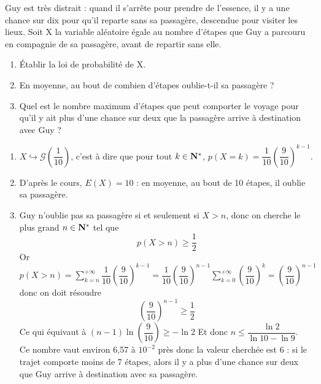 \documentclass[a4paper, 12pt]{colle}
\begin{document}
\exo
Guy est très distrait : quand il s'arrête pour prendre de l'essence, il y a une chance sur dix pour qu'il reparte sans sa passagère, descendue pour visiter les lieux.
Soit X la variable aléatoire égale au nombre d'étapes que Guy a parcouru en compagnie de sa passagère, avant de repartir sans elle.
\begin{enumerate}[\bfseries 1.]
	\item Établir la loi de probabilité de X.
	\item En moyenne, au bout de combien d'étapes oublie-t-il sa passagère ?
	\item Quel est le nombre maximum d'étapes que peut comporter le voyage pour qu'il y ait plus d'une chance sur deux que la passagère arrive à destination avec Guy ?
\end{enumerate}
\corr
\begin{enumerate}[\bfseries 1.]
	\item $X\hookrightarrow\mathcal{G}\left(\dfrac{1}{10}\right)$,
	      c'est à dire que pour tout $k\in\mathbf{N}^*$, $p(X=k)=\dfrac{1}{10}\left(\dfrac{9}{10}\right)^{k-1}$.
	\item D'après le cours, $E(X)=10$ : en moyenne, au bout de 10 étapes, il oublie sa passagère.
	\item Guy n'oublie pas sa passagère si et seulement si $X>n$, donc on cherche le plus grand $n\in\mathbf{N}^*$ tel que $$p(X>n) \geqslant \dfrac{1}{2}$$
	      Or $\displaystyle p(X>n)=\sum_{k=n}^{+\infty}\dfrac{1}{10}\left(\dfrac{9}{10}\right)^{k-1}=\dfrac{1}{10}\left(\dfrac{9}{10}\right)^{n-1}\sum_{k=0}^{+\infty}\left(\dfrac{9}{10}\right)^k=\left(\dfrac{9}{10}\right)^{n-1}$ donc on doit résoudre
	      $$\left(\dfrac{9}{10}\right)^{n-1}\geqslant \dfrac{1}{2}$$
	      Ce qui équivaut à $(n-1)\ln\left(\dfrac{9}{10}\right)\geqslant -\ln 2$
	      Et donc $n \leqslant \dfrac{\ln 2}{\ln 10 - \ln 9}$.\\
	      Ce nombre vaut environ 6,57 à $10^{-2}$ près donc la valeur cherchée est 6 : si le trajet comporte moins de 7 étapes, alors il y a plus d'une chance sur deux que Guy arrive à destination avec sa passagère.
\end{enumerate}
\end{document}
